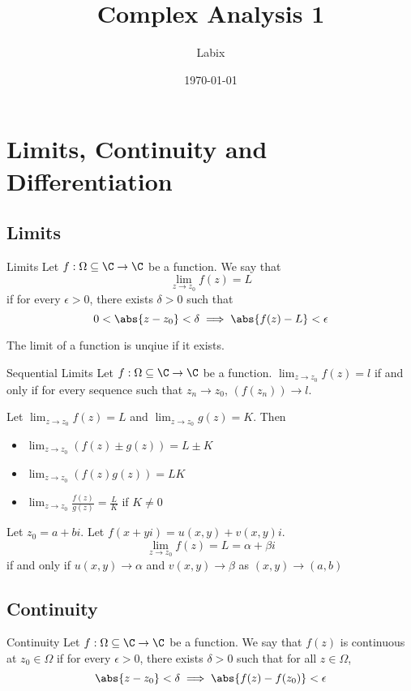 \documentclass[a4paper]{article}
\title{Complex Analysis 1}
\author{Labix}
\date{\today}
\begin{document}
\maketitle
\begin{abstract}
\end{abstract}
\pagebreak
\tableofcontents
\pagebreak

\section{Limits, Continuity and Differentiation}
\subsection{Limits}
\begin{defn}{Limits}{} Let $f:\Omega\subseteq\C\to\C$ be a function. We say that $$\lim_{z\to z_0}f(z)=L$$ if for every $\epsilon>0$, there exists $\delta>0$ such that $$0<\abs{z-z_0}<\delta\implies\abs{f(z)-L}<\epsilon$$
\end{defn}

\begin{prp}{}{} The limit of a function is unqiue if it exists. 
\end{prp}

\begin{thm}{Sequential Limits}{} Let $f:\Omega\subseteq\C\to\C$ be a function. $\lim_{z\to z_0}f(z)=l$ if and only if for every sequence such that $z_n\to z_0$, $(f(z_n))\to l$. 
\end{thm}

\begin{prp}{}{} Let $\lim_{z\to z_0}f(z)=L$ and $\lim_{z\to z_0}g(z)=K$. Then
\begin{itemize}
\item $\lim_{z\to z_0}(f(z)\pm g(z))=L\pm K$
\item $\lim_{z\to z_0}(f(z)g(z))=LK$
\item $\lim_{z\to z_0}\frac{f(z)}{g(z)}=\frac{L}{K}$ if $K\neq0$
\end{itemize}
\end{prp}

\begin{prp}{}{} Let $z_0=a+bi$. Let $f(x+yi)=u(x,y)+v(x,y)i$. $$\lim_{z\to z_0}f(z)=L=\alpha+\beta i$$ if and only if $u(x,y)\to\alpha$ and $v(x,y)\to\beta$ as $(x,y)\to(a,b)$
\end{prp}

\subsection{Continuity}
\begin{defn}{Continuity}{} Let $f:\Omega\subseteq\C\to\C$ be a function. We say that $f(z)$ is continuous at $z_0\in\Omega$ if for every $\epsilon>0$, there exists $\delta>0$ such that for all $z\in\Omega$, $$\abs{z-z_0}<\delta\implies\abs{f(z)-f(z_0)}<\epsilon$$
\end{defn}
\end{document}
